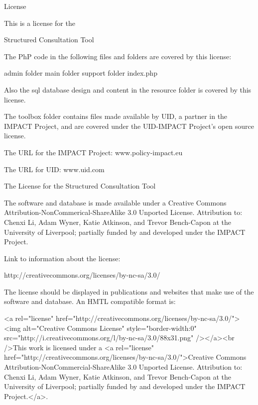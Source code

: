 License

This is a license for the

Structured Consultation Tool

The PhP code in the following files and folders are covered by this license:

admin folder
main folder
support folder
index.php

Also the sql database design and content in the resource folder is covered by this license.

The toolbox folder contains files made available by UID, a partner in the IMPACT Project, and are covered under the UID-IMPACT Project's open source license.

The URL for the IMPACT Project:  www.policy-impact.eu

The URL for UID:    www.uid.com

The License for the Structured Consultation Tool

The software and database is made available under a Creative Commons Attribution-NonCommerical-ShareAlike 3.0 Unported License.  Attribution to:  Chenxi Li, Adam Wyner, Katie Atkinson, and Trevor Bench-Capon at the University of Liverpool; partially funded by and developed under the IMPACT Project.

Link to information about the license:

http://creativecommons.org/licenses/by-nc-sa/3.0/

The license should be displayed in publications and websites that make use of the software and database.  An HMTL compatible format is:

<a rel="license" href="http://creativecommons.org/licenses/by-nc-sa/3.0/"><img alt="Creative Commons License" style="border-width:0" src="http://i.creativecommons.org/l/by-nc-sa/3.0/88x31.png" /></a><br />This work is licensed under a <a rel="license" href="http://creativecommons.org/licenses/by-nc-sa/3.0/">Creative Commons Attribution-NonCommercial-ShareAlike 3.0 Unported License.  Attribution to:  Chenxi Li, Adam Wyner, Katie Atkinson, and Trevor Bench-Capon at the University of Liverpool; partially funded by and developed under the IMPACT Project.</a>.